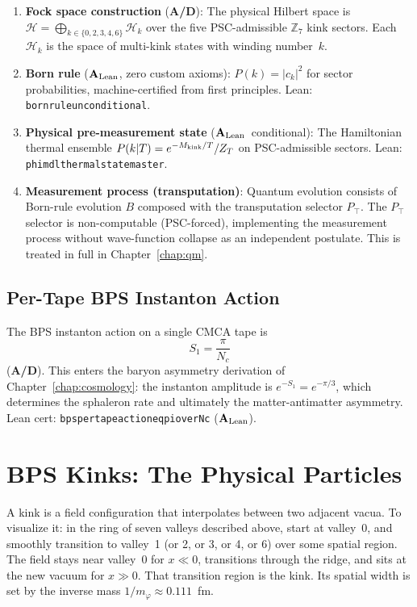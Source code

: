 \documentclass[11pt,openany]{book}
\theoremstyle{remark}
\newcommand{\ZS}{\mathbb{Z}_7}
\newcommand{\lean}[1]{%
  \penalty-100
  \begingroup\def\_{\textunderscore\allowbreak}\texttt{#1}\endgroup}
\newcommand{\Mkink}{M_{\rm kink}}
\newcommand{\CatAL}{\ensuremath{\textbf{A}_{\rm Lean}}}
\newcommand{\CatAD}{\textbf{A/D}}
\begin{document}
\begin{enumerate}[itemsep=4pt]
\item \textbf{Fock space construction} (\CatAD):
  The physical Hilbert space is
  $\mathcal{H} = \bigoplus_{k\in\{0,2,3,4,6\}}\mathcal{H}_k$
  over the five PSC-admissible $\ZS$ kink sectors.
  Each $\mathcal{H}_k$ is the space of multi-kink states with winding number~$k$.

\item \textbf{Born rule} (\CatAL, zero custom axioms):
  $P(k) = |c_k|^2$ for sector probabilities, machine-certified from first principles.
  Lean: \lean{born\_rule\_unconditional}.

\item \textbf{Physical pre-measurement state} (\CatAL\ conditional):
  The Hamiltonian thermal ensemble $P(k|T) = e^{-\Mkink/T}/Z_T$ on PSC-admissible sectors.
  Lean: \lean{phimdl\_thermal\_state\_master}.

\item \textbf{Measurement process (transputation)}:
  Quantum evolution consists of Born-rule evolution $B$ composed with the
  transputation selector $P_\top$.
  The $P_\top$ selector is non-computable (PSC-forced), implementing the
  measurement process without wave-function collapse as an independent postulate.
  This is treated in full in Chapter~\ref{chap:qm}.
\end{enumerate}

\subsection*{Per-Tape BPS Instanton Action}

The BPS instanton action on a single CMCA tape is
\[
S_1 = \frac{\pi}{N_c}
\]
(\CatAD).
This enters the baryon asymmetry derivation of Chapter~\ref{chap:cosmology}:
the instanton amplitude is $e^{-S_1} = e^{-\pi/3}$, which determines the
sphaleron rate and ultimately the matter-antimatter asymmetry.
Lean cert: \lean{bps\_per\_tape\_action\_eq\_pi\_over\_Nc} (\CatAL).

\section{BPS Kinks: The Physical Particles}
\label{sec:bps_kinks}

A kink is a field configuration that interpolates between two adjacent vacua.
To visualize it: in the ring of seven valleys described above, start at valley~0,
and smoothly transition to valley~1 (or 2, or 3, or 4, or 6) over some spatial region.
The field stays near valley~0 for $x\ll 0$, transitions through the ridge, and
sits at the new vacuum for $x\gg 0$.
That transition region is the kink.
Its spatial width is set by the inverse mass $1/m_\varphi \approx 0.111$~fm.
\end{document}
